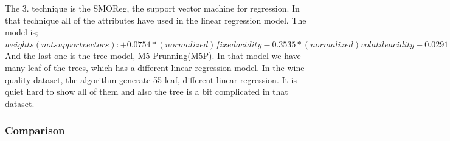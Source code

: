 \documentclass[a4paper]{article}
\begin{document}
The 3. technique is the SMOReg, the support vector machine for regression. In that technique all of the attributes have used in the linear regression model. The model is;\\
$weights (not support vectors):
 +       0.0754 * (normalized) fixed acidity
 -       0.3535 * (normalized) volatile acidity
 -       0.0291 * (normalized) citric acid
 +       0.7259 * (normalized) residual sugar
 -       0.0609 * (normalized) chlorides
 +       0.2402 * (normalized) free sulfur dioxide
 -       0.049  * (normalized) total sulfur dioxide
 -       0.9238 * (normalized) density
 +       0.1421 * (normalized) pH
 +       0.1072 * (normalized) sulphates
 +       0.2417 * (normalized) alcohol
 +       0.3849$\\

And the last one is the tree model, M5 Prunning(M5P). In that model we have many leaf of the trees, which has a different linear regression model. In the wine quality dataset, the algorithm generate 55 leaf, different linear regression. It is quiet hard to show all of them and also the tree is a bit complicated in that dataset.


\subsubsection{Comparison}
\end{document}
